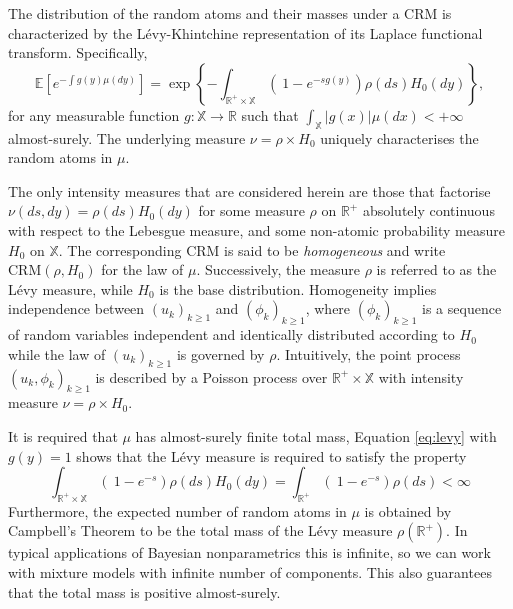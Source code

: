 The distribution of the random atoms and their masses under a \gls{CRM} is characterized by the Lévy-Khintchine representation of its Laplace functional transform. Specifically,
\begin{equation} \label{eq:levy}
\mathbb{E} \left[e^{-\int g(y)\mu(dy)} \right] = \exp \left\{ - \int_{\mathbb{R}^+ \times \mathbb{X}} \left( \  1 - e^{-sg(y)} \right) \rho(ds) H_0(dy) \right\},
\end{equation}
for any measurable function $g: \mathbb{X} \rightarrow \mathbb{R}$ such that $\int_{\mathbb{X}}|g(x)|\mu(dx)<+ \infty$ almost-surely.
The underlying measure $\nu = \rho \times H_0$ uniquely characterises the random atoms in $\mu$.

The only intensity measures that are considered herein are those that factorise $\nu(ds, dy) = \rho(ds)H_0(dy)$ for some measure $\rho$ on $\mathbb{R}^+$ absolutely continuous with respect to the Lebesgue measure, and some non-atomic probability measure $H_0$ on $\mathbb{X}$. The corresponding \gls{CRM} is said to be \textit{homogeneous} and write $\text{CRM}(\rho, H_0)$ for the law of $\mu$. Successively, the measure $\rho$ is referred to as the Lévy measure, while $H_0$ is the base distribution.
Homogeneity implies independence between $\left(u_k \right)_{k\ge1}$ and $\left(\phi_k \right)_{k\ge1}$, where $\left(\phi_k \right)_{k\ge1}$ is a sequence of random variables independent and identically distributed according to $H_0$ while the law of $\left(u_k \right)_{k\ge1}$  is governed by $\rho$. Intuitively, the point process $\left(u_k, \phi_k \right)_{k\ge1}$  is described by a Poisson process over $\mathbb{R}^+ \times \mathbb{X}$ with intensity measure $\nu = \rho \times H_0$.

It is required that $\mu$ has almost-surely finite total mass, Equation \ref{eq:levy} with $g(y)=1$ shows that the Lévy measure is required to satisfy the property
$$ \int_{\mathbb{R}^+ \times \mathbb{X}} \left( \  1 - e^{-s} \right) \rho(ds) H_0(dy) = 
\int_{\mathbb{R}^+} \left( \  1 - e^{-s} \right) \rho(ds) < \infty $$
Furthermore, the expected number of random atoms in $\mu$ is obtained by Campbell’s Theorem to be the total mass of the Lévy measure $\rho(\mathbb{R}^+)$. In typical applications of Bayesian nonparametrics this is infinite, so we can work with mixture models with infinite number of components. This also guarantees that the total mass is positive almost-surely.

